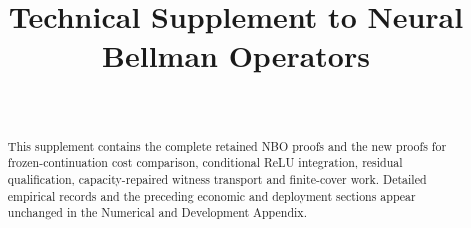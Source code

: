 \documentclass[ecta,nameyear,draft]{econsocart}
\begin{document}
\begin{frontmatter}
\title{Technical Supplement to Neural Bellman Operators}
\begin{aug}
\author[id=au1,addressref={add1}]{~}
\address[id=add1]{Peking University}
\end{aug}
\begin{abstract}
This supplement contains the complete retained NBO proofs and the new proofs for frozen-continuation cost comparison, conditional ReLU integration, residual qualification, capacity-repaired witness transport and finite-cover work. Detailed empirical records and the preceding economic and deployment sections appear unchanged in the Numerical and Development Appendix.
\end{abstract}
\end{frontmatter}





\end{document}
